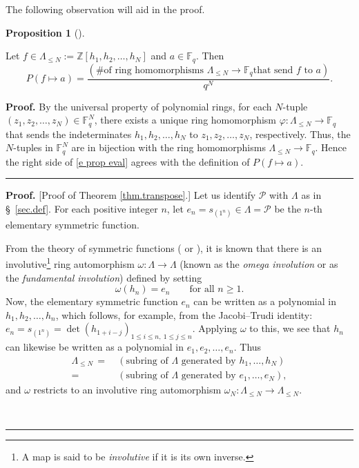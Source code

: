 \documentclass[numbers=enddot,12pt,final,onecolumn,notitlepage]{scrartcl}%
\theoremstyle{definition}
\newtheorem{prop}[theo]{Proposition}
\newenvironment{proposition}[1][]
{\begin{prop}[#1]\begin{leftbar}}
{\end{leftbar}\end{prop}}
\newenvironment{proof}[1][Proof]{\noindent\textbf{#1.} }{\ \rule{0.5em}{0.5em}}
\newenvironment{vershort}{}{}
\newcommand{\tup}[1]{\left( #1 \right)}
\newcommand{\Fq}{\mathbb{F}_q}
\renewcommand{\leq}{\leqslant}
\renewcommand{\geq}{\geqslant}
\theoremstyle{plainsl}
\begin{document}
\begin{vershort}
The following observation will aid in the proof.

\begin{proposition}
\label{prop.eval}
Let $f \in \Lambda_{\le N} := \mathbb{Z}\left[  h_{1},h_{2},\ldots, h_N\right]$ and  $a \in \mathbb{F}_q$.
Then
\begin{equation}
\label{e prop eval}
P\left(  f\mapsto a\right)  =
\dfrac{\left(  \text{\# of ring homomorphisms  $\Lambda_{\le N} \to \mathbb{F}_q$
that send  $f$ to  $a$} \right)  }{q^N}.
\end{equation}
\end{proposition}
\begin{proof}
By the universal property of polynomial rings, for each $N$-tuple $\left(  z_{1},z_{2}%
,\ldots,z_{N}\right)  \in\Fq^{N}$, there exists a unique ring
homomorphism $\varphi:\Lambda_{\leq N}\rightarrow\Fq$ that
sends the indeterminates $h_{1},h_{2},\ldots,h_{N}$ to $z_{1},z_{2}
,\ldots,z_{N}$, respectively. Thus, the $N$-tuples in
$\Fq^N$ are in bijection with the ring homomorphisms
$\Lambda_{\le N} \to \mathbb{F}_q$.
Hence the right side of \eqref{e prop eval}
agrees with the definition of $P\left(  f\mapsto a\right)$.
\end{proof}


\begin{proof}
[Proof of Theorem \ref{thm.transpose}.] Let us identify $\mathcal{P}$ with
$\Lambda$ as in \S \ \ref{sec.def}. For each positive integer $n$, let
$e_{n}=s_{\left(  1^{n}\right)  }\in\Lambda=\mathcal{P}$ be the $n$-th
elementary symmetric function.

From the theory of symmetric functions (\cite[\S 7.6]{EC2} or \cite[(2.7)]%
{Macdonald}), it is known that there is an involutive\footnote{A map is said
to be \emph{involutive} if it is its own inverse.} ring automorphism
$\omega:\Lambda\rightarrow\Lambda$ (known as the \emph{omega involution} or as
the \emph{fundamental involution}) defined by setting
\[
\omega\left(  h_{n}\right)  =e_{n}\qquad\text{for all }n\geq1.
\]
Now, the elementary symmetric function $e_{n}$ can be written as a polynomial in $h_{1},h_{2},\ldots,h_{n}$,
which follows, for example, from the Jacobi--Trudi identity:
$e_{n}=s_{\left(  1^{n}\right)  }=\det\left(  h_{1+i-j}\right)  _{1\leq i\leq
n,\ 1\leq j\leq n}$. Applying  $\omega$ to this, we see that
$h_{n}$ can likewise be written as a polynomial in $e_{1},e_{2},\ldots,e_{n}$.
Thus
\begin{align*}
\Lambda_{\le N} \, = &\  \tup{\text{subring of $\Lambda$ generated by $h_1, \dots, h_N$} } \\
            = &\  \tup{\text{subring of $\Lambda$ generated by $e_1, \dots, e_N$} },
\end{align*}
and $\omega$ restricts to an involutive ring automorphism
 $\omega_N \colon \Lambda_{\le N} \to \Lambda_{\le N}$.


\end{proof}
\end{vershort}
\end{document}
